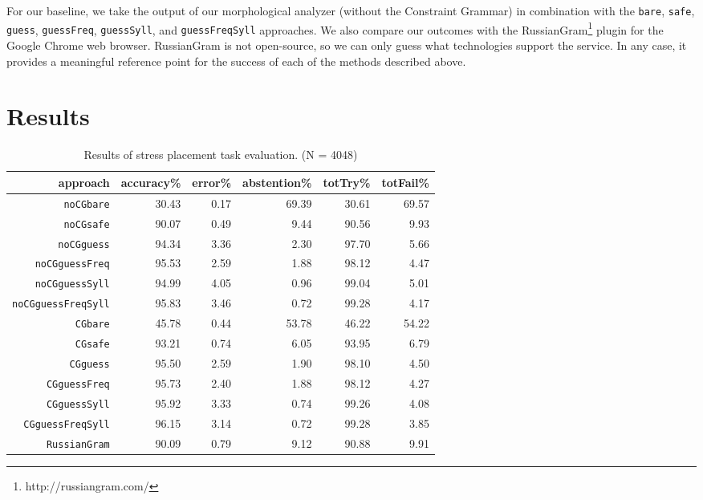 \documentclass[11pt]{article}
\begin{document}
For our baseline, we take the output of our morphological analyzer (without the 
Constraint Grammar) in combination with the {\small {\tt bare}}, 
{\small {\tt safe}}, {\small {\tt guess}}, {\small {\tt guessFreq}}, 
{\small {\tt guessSyll}}, and {\small {\tt guessFreqSyll}} approaches. We also 
compare our outcomes with the RussianGram\footnote{http://russiangram.com/} 
plugin for the Google Chrome web browser. RussianGram is not open-source, so we
can only guess what technologies support the service. In any case, it provides a
meaningful reference point for the success of each of the methods described 
above.

\section{Results}

\begin{table*}[t]
  \centering
  \begin{tabular}{r | r r r | r r }
    approach & accuracy\% & error\% & abstention\% & totTry\% & totFail\% \\
    \hline
    \hline
    {\small {\tt noCGbare}} & 30.43 & 0.17 & 69.39 & 30.61 & 69.57 \\
    {\small {\tt noCGsafe}} & 90.07 & 0.49 & 9.44 & 90.56 & 9.93 \\
    {\small {\tt noCGguess}} & 94.34 & 3.36 & 2.30 & 97.70 & 5.66 \\
    {\small {\tt noCGguessFreq}} & 95.53 & 2.59 & 1.88 & 98.12 & 4.47 \\
    {\small {\tt noCGguessSyll}} & 94.99 & 4.05 & 0.96 & 99.04 & 5.01 \\
    {\small {\tt noCGguessFreqSyll}} & 95.83 & 3.46 & 0.72 & 99.28 & 4.17 \\
    \hline
    {\small {\tt CGbare}} & 45.78 & 0.44 & 53.78 & 46.22 & 54.22 \\
    {\small {\tt CGsafe}} & 93.21 & 0.74 & 6.05 & 93.95 & 6.79 \\
    {\small {\tt CGguess}} & 95.50 & 2.59 & 1.90 & 98.10 & 4.50 \\
    {\small {\tt CGguessFreq}} & 95.73 & 2.40 & 1.88 & 98.12 & 4.27 \\
    {\small {\tt CGguessSyll}} & 95.92 & 3.33 & 0.74 & 99.26 & 4.08 \\
    {\small {\tt CGguessFreqSyll}} & 96.15 & 3.14 & 0.72 & 99.28 & 3.85 \\
    \hline
    {\small {\tt RussianGram}} & 90.09 & 0.79 & 9.12 & 90.88 & 9.91
  \end{tabular}
  \caption{Results of stress placement task evaluation. (N = 4048)}
  \label{tab:results}
\end{table*}
\end{document}
